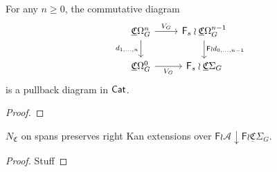\documentclass[a4paper,10pt
,draft
]{article}%
\newcommand{\UC}{\underline{\mathfrak C}}
\begin{document}
\begin{proposition}[{cf. \cite[Prop 3.82]{BP17}}]
      For any $n \geq 0$, the commutative diagram
      \begin{equation}
            \begin{tikzcd}
                  \UC\Omega_G^n \arrow[d, "d_{1,\dots,n}"'] \arrow[r, "V_G"]
                  &
                  \mathsf F_s \wr \UC\Omega_G^{n-1} \arrow[d, "\mathsf F \wr d_{0,\dots,n-1}"]
                  \\
                  \UC\Omega_G^0 \arrow[r, "V_G"']
                  &
                  \mathsf F_s \wr \UC\Sigma_G
            \end{tikzcd}
      \end{equation}
      is a pullback diagram in $\mathsf{Cat}$.
\end{proposition}
\begin{proof}
\end{proof}

\begin{proposition}
      [{cf. \cite[Lemma 4.28]{BP17}}]
      $N_{\mathfrak C}$ on spans preserves right Kan extensions over $\mathsf F \wr \mathcal A \downarrow \mathsf F \wr \UC\Sigma_G$.
\end{proposition}
\begin{proof}
      Stuff
\end{proof}
\end{document}
